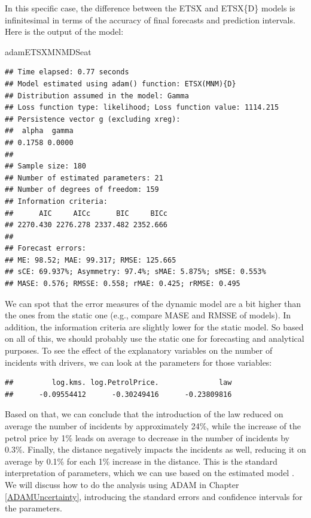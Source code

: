 \documentclass[]{book}
\newenvironment{Shaded}{\begin{snugshade}}{\end{snugshade}}
\newcommand{\NormalTok}[1]{#1}
\newcommand{\OperatorTok}[1]{\textcolor[rgb]{0.81,0.36,0.00}{\textbf{#1}}}
\theoremstyle{definition}
\theoremstyle{definition}
\theoremstyle{definition}
\theoremstyle{definition}
\theoremstyle{remark}
\begin{document}
In this specific case, the difference between the ETSX and ETSX\{D\} models is infinitesimal in terms of the accuracy of final forecasts and prediction intervals. Here is the output of the model:

\begin{Shaded}
\begin{Highlighting}[]
\NormalTok{adamETSXMNMDSeat}
\end{Highlighting}
\end{Shaded}

\begin{verbatim}
## Time elapsed: 0.77 seconds
## Model estimated using adam() function: ETSX(MNM){D}
## Distribution assumed in the model: Gamma
## Loss function type: likelihood; Loss function value: 1114.215
## Persistence vector g (excluding xreg):
##  alpha  gamma 
## 0.1758 0.0000 
## 
## Sample size: 180
## Number of estimated parameters: 21
## Number of degrees of freedom: 159
## Information criteria:
##      AIC     AICc      BIC     BICc 
## 2270.430 2276.278 2337.482 2352.666 
## 
## Forecast errors:
## ME: 98.52; MAE: 99.317; RMSE: 125.665
## sCE: 69.937%; Asymmetry: 97.4%; sMAE: 5.875%; sMSE: 0.553%
## MASE: 0.576; RMSSE: 0.558; rMAE: 0.425; rRMSE: 0.495
\end{verbatim}

We can spot that the error measures of the dynamic model are a bit higher than the ones from the static one (e.g., compare MASE and RMSSE of models). In addition, the information criteria are slightly lower for the static model. So based on all of this, we should probably use the static one for forecasting and analytical purposes. To see the effect of the explanatory variables on the number of incidents with drivers, we can look at the parameters for those variables:

\begin{Shaded}
\end{Shaded}

\begin{verbatim}
##         log.kms. log.PetrolPrice.              law 
##      -0.09554412      -0.30249416      -0.23809816
\end{verbatim}

Based on that, we can conclude that the introduction of the law reduced on average the number of incidents by approximately 24\%, while the increase of the petrol price by 1\% leads on average to decrease in the number of incidents by 0.3\%. Finally, the distance negatively impacts the incidents as well, reducing it on average by 0.1\% for each 1\% increase in the distance. This is the standard interpretation of parameters, which we can use based on the estimated model \citep[see, for example, discussion in Section 8.3 of][]{SvetunkovSBA}. We will discuss how to do the analysis using ADAM in Chapter \ref{ADAMUncertainty}, introducing the standard errors and confidence intervals for the parameters.
\end{document}
